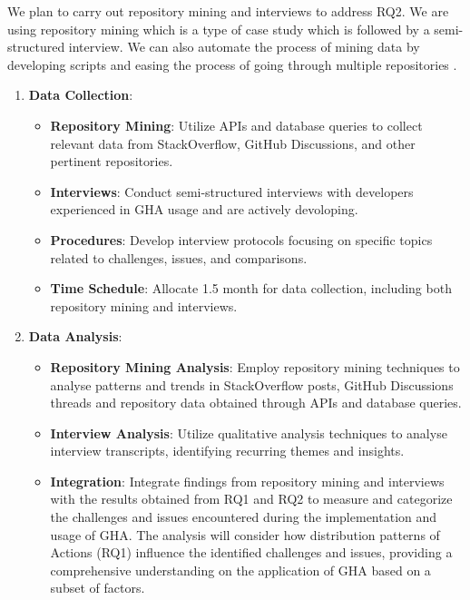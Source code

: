 \documentclass[conference]{IEEEtran}
\begin{document}
    We plan to carry out repository mining and interviews to address RQ2. We are using repository mining which is  a type of case study which is followed by a semi-structured interview. We can also automate the process of mining data by developing scripts and easing the process of going through multiple repositories \cite{chaturvedi2013tools}.\\

    \begin{enumerate}
        \item \textbf{Data Collection}:\\
        \begin{itemize}
            \item \textbf{Repository Mining}: Utilize APIs and database queries to collect relevant data from StackOverflow, GitHub Discussions, and other pertinent repositories.
            \item \textbf{Interviews}: Conduct semi-structured interviews with developers experienced in GHA usage and are actively devoloping.
            \item \textbf{Procedures}: Develop interview protocols focusing on specific topics related to challenges, issues, and comparisons.
            \item \textbf{Time Schedule}: Allocate 1.5 month for data collection, including both repository mining and interviews.\\
        \end{itemize}
        
        \item \textbf{Data Analysis}:\\
        \begin{itemize}
            \item \textbf{Repository Mining Analysis}: Employ repository mining techniques to analyse patterns and trends in StackOverflow posts, GitHub Discussions threads and repository data obtained through APIs and database queries.
            \item \textbf{Interview Analysis}: Utilize qualitative analysis techniques to analyse interview transcripts, identifying recurring themes and insights.
            \item \textbf{Integration}: Integrate findings from repository mining and interviews with the results obtained from RQ1 and RQ2 to measure and categorize the challenges and issues encountered during the implementation and usage of GHA. The analysis will consider how distribution patterns of Actions (RQ1) influence the identified challenges and issues, providing a comprehensive understanding on the application of GHA based on a subset of factors.\\
        \end{itemize}
    \end{enumerate}
\end{document}
